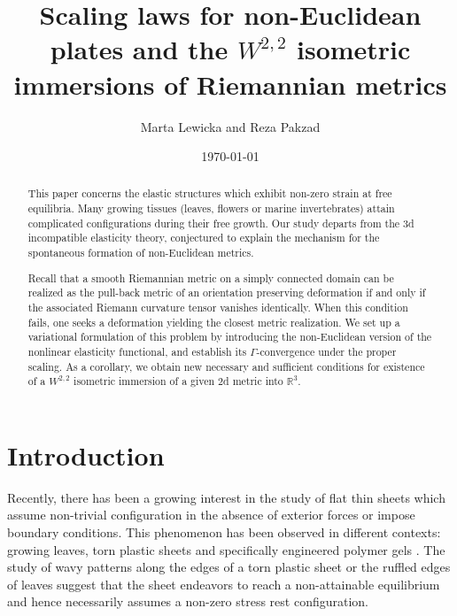 \documentclass[leqno,twoside, 11pt]{amsart}
\theoremstyle{plain}
\theoremstyle{definition}
\numberwithin{equation}{section}
\numberwithin{figure}{section}
\begin{document}
\title[non-Euclidean plates]
{Scaling laws for non-Euclidean plates and the 
    $W^{2,2}$ isometric immersions of Riemannian metrics}
\author{Marta Lewicka and Reza Pakzad}
\address{Marta Lewicka, University of Minnesota, Department of Mathematics, 
206 Church St. S.E., Minneapolis, MN 55455}
\address{Reza Pakzad, University of Pittsburgh, 
Department of Mathematics, 139 University Place, Pittsburgh, PA 15260}
 
\date{\today}
\begin{abstract} 
This paper concerns the elastic structures which exhibit non-zero strain at
free equilibria. Many growing tissues (leaves, 
flowers or marine invertebrates) attain complicated configurations 
during their free growth. Our study departs from 
the $3$d incompatible elasticity theory, conjectured to explain 
the mechanism for the spontaneous formation of non-Euclidean metrics.

Recall that a smooth Riemannian metric on a simply connected domain can
be realized as the pull-back metric of an orientation preserving deformation if
and only if the associated Riemann curvature tensor vanishes identically.
When this condition fails, one seeks a deformation yielding 
the closest metric realization.  
We set up a variational formulation of this problem by
introducing the non-Euclidean version of the nonlinear 
elasticity functional, and establish its $\Gamma$-convergence under the proper
scaling.  As a corollary, we obtain new necessary and sufficient conditions 
for existence of a $W^{2,2}$ isometric immersion of a given $2$d metric
into $\mathbb R^3$.
\end{abstract}

\maketitle
\tableofcontents

\section{Introduction}

Recently, there has been a growing interest in the study of flat thin sheets
which assume non-trivial configuration in the absence of exterior forces 
or impose boundary conditions. 
This phenomenon has been observed in different contexts: growing leaves,
torn plastic sheets and specifically engineered polymer gels \cite{klein}.
The study of wavy patterns along the edges of a torn plastic sheet or the
ruffled edges of leaves suggest that the sheet endeavors to reach
a non-attainable equilibrium and hence necessarily assumes 
a non-zero stress rest configuration.
\end{document}
